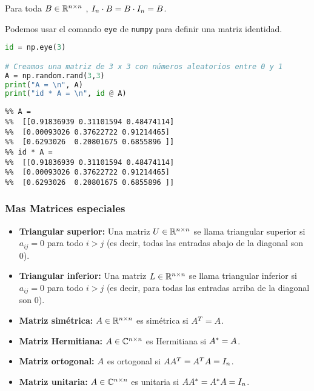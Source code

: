 \begin{prop}
Para toda $\Bb \in \R^{n \times n}$ , $I_n \cdot \Bb = \Bb \cdot I_n = \Bb$.
\end{prop}

Podemos usar el comando \texttt{eye} de \texttt{numpy} para definir una matriz identidad.

\begin{Shaded}
\begin{lstlisting}[language=Python]
id = np.eye(3)

# Creamos una matriz de 3 x 3 con números aleatorios entre 0 y 1
A = np.random.rand(3,3)
print("A = \n", A)
print("id * A = \n", id @ A)
\end{lstlisting}
\end{Shaded}

\begin{verbatim}
%% A =
%%  [[0.91836939 0.31101594 0.48474114]
%%  [0.00093026 0.37622722 0.91214465]
%%  [0.6293026  0.20801675 0.6855896 ]]
%% id * A =
%%  [[0.91836939 0.31101594 0.48474114]
%%  [0.00093026 0.37622722 0.91214465]
%%  [0.6293026  0.20801675 0.6855896 ]]
\end{verbatim}

\subsubsection{Mas Matrices especiales}

\begin{itemize}
\item \textbf{Triangular superior:} Una matriz $\Ub \in \R^{n \times n}$ se llama triangular superior si $a_{ij} = 0$ para todo $i > j$ (es decir, todas las entradas abajo de la diagonal son 0).
\item \textbf{Triangular inferior:} Una matriz $\Lb \in \R^{n \times n}$ se llama triangular inferior si $a_{ij} = 0$ para todo $i > j$ (es decir, para todas las entradas arriba de la diagonal son 0).
\item \textbf{Matriz simétrica:} $\Ab\in \R^{n\times n}$ es simétrica si $\Ab^T = \Ab$.
\item \textbf{Matriz Hermitiana:} $\Ab\in \C^{n\times n}$ es Hermitiana si $\Ab^* = \Ab$.
\item \textbf{Matriz ortogonal:} $\Ab$ es ortogonal si $\Ab\Ab^T = \Ab^T\Ab = \Id_n$.
\item \textbf{Matriz unitaria:} $\Ab\in \C^{n\times n}$ es unitaria si $\Ab\Ab^* = \Ab^*\Ab = \Id_n$.
\end{itemize}

